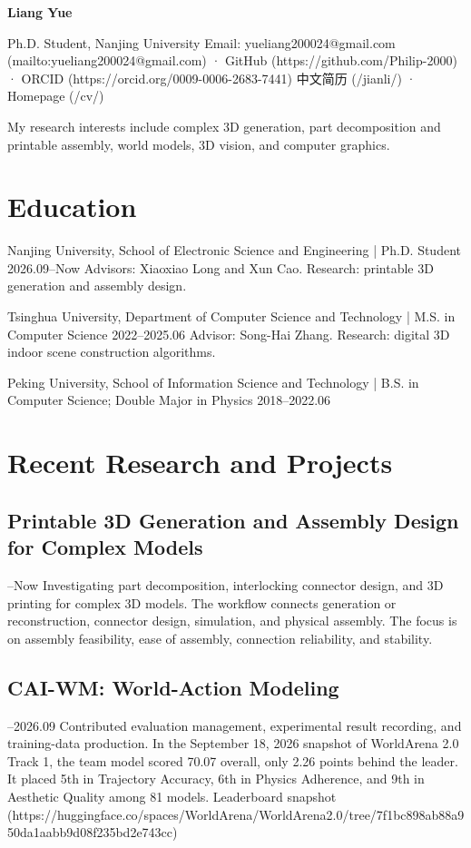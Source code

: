 \documentclass[a4paper,10pt]{article}
\begin{document}
{\LARGE\bfseries Liang Yue}\par
\par\smallskip
Ph.D. Student, Nanjing University
Email: yueliang200024@gmail.com (mailto:yueliang200024@gmail.com) · GitHub (https://github.com/Philip-2000) · ORCID (https://orcid.org/0009-0006-2683-7441)
中文简历 (/jianli/) · Homepage (/cv/)
\par\smallskip
My research interests include complex 3D generation, part decomposition and printable assembly, world models, 3D vision, and computer graphics.
\par\smallskip
\section*{Education}
\par\smallskip
Nanjing University, School of Electronic Science and Engineering | Ph.D. Student 2026.09–Now
Advisors: Xiaoxiao Long and Xun Cao. Research: printable 3D generation and assembly design.
\par\smallskip
Tsinghua University, Department of Computer Science and Technology | M.S. in Computer Science 2022–2025.06
Advisor: Song-Hai Zhang. Research: digital 3D indoor scene construction algorithms.
\par\smallskip
Peking University, School of Information Science and Technology | B.S. in Computer Science; Double Major in Physics 2018–2022.06
\par\smallskip
\section*{Recent Research and Projects}
\par\smallskip
\subsection*{Printable 3D Generation and Assembly Design for Complex Models}
\par{}–Now
Investigating part decomposition, interlocking connector design, and 3D printing for complex 3D models. The workflow connects generation or reconstruction, connector design, simulation, and physical assembly. The focus is on assembly feasibility, ease of assembly, connection reliability, and stability.
\par\smallskip
\subsection*{CAI-WM: World-Action Modeling}
\par{}–2026.09
Contributed evaluation management, experimental result recording, and training-data production. In the September 18, 2026 snapshot of WorldArena 2.0 Track 1, the team model scored 70.07 overall, only 2.26 points behind the leader. It placed 5th in Trajectory Accuracy, 6th in Physics Adherence, and 9th in Aesthetic Quality among 81 models.
Leaderboard snapshot (https://huggingface.co/spaces/WorldArena/WorldArena2.0/tree/7f1bc898ab88a950da1aabb9d08f235bd2e743cc)
\par\smallskip
\end{document}
